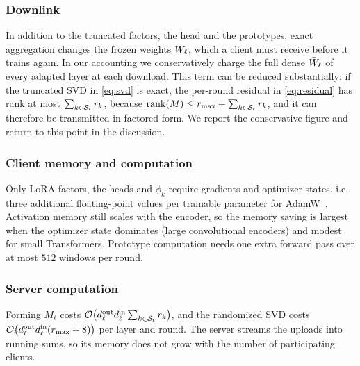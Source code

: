 \subsubsection{Downlink}
In addition to the truncated factors, the head and the prototypes, exact aggregation changes the
frozen weights $\bar{W}_\ell$, which a client must receive before it trains again. In our accounting we
conservatively charge the full dense $\bar{W}_\ell$ of every adapted layer at each download. This term
can be reduced substantially: if the truncated SVD in \cref{eq:svd} is exact, the per-round residual
in \cref{eq:residual} has rank at most $\sum_{k\in\mathcal{S}_t}r_k$, because
$\mathrm{rank}(M)\le r_{\max}+\sum_{k\in\mathcal{S}_t}r_k$, and it can therefore be transmitted in factored form.
We report the conservative figure and return to this point in the discussion.

\subsubsection{Client memory and computation}
Only LoRA factors, the heads and $\phi_k$ require gradients and optimizer states, i.e., three
additional floating-point values per trainable parameter for AdamW~\cite{loshchilov2019adamw}.
Activation memory still scales with the encoder, so the memory saving is largest when the
optimizer state dominates (large convolutional encoders) and modest for small Transformers.
Prototype computation needs one extra forward pass over at most $512$ windows per round.

\subsubsection{Server computation}
Forming $M_\ell$ costs $\mathcal{O}\big(d^{\mathrm{out}}_\ell d^{\mathrm{in}}_\ell\sum_{k\in\mathcal{S}_t}r_k\big)$, and the
randomized SVD costs $\mathcal{O}\big(d^{\mathrm{out}}_\ell d^{\mathrm{in}}_\ell(r_{\max}+8)\big)$ per layer and
round. The server streams the uploads into running sums, so its memory does not grow with the
number of participating clients.

